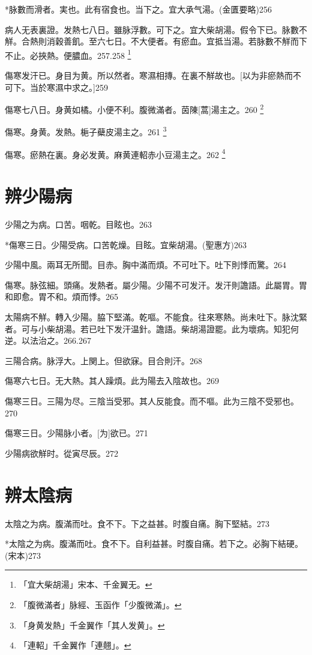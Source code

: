 \documentclass[12pt,twoside,UTF8,b5paper]{ctexbook}
\begin{document}
*脉數而滑者。実也。此有宿食也。当下之。宜大承气湯。(金匱要略)256

病人无表裏證。发熱七八日。雖脉浮數。可下之。宜大柴胡湯。假令下已。脉數不觧。合熱則消穀善飢。至六七日。不大便者。有瘀血。宜抵当湯。若脉數不觧而下不止。必挾熱。便膿血。257.258
	\footnote{「宜大柴胡湯」宋本、千金翼无。}

傷寒发汗已。身目为黄。所以然者。寒濕相摶。在裏不觧故也。[以为非瘀熱而不可下。当於寒濕中求之。]259

傷寒七八日。身黄如橘。小便不利。腹微滿者。茵陳[蒿]湯主之。260
	\footnote{「腹微滿者」脉經、玉函作「少腹微滿」。}

傷寒。身黄。发熱。梔子蘗皮湯主之。261
	\footnote{「身黄发熱」千金翼作「其人发黄」。}

傷寒。瘀熱在裏。身必发黄。麻黄連軺赤小豆湯主之。262
	\footnote{「連軺」千金翼作「連翹」。}

\chapter{辨少陽病}

少陽之为病。口苦。咽乾。目眩也。263

*傷寒三日。少陽受病。口苦乾燥。目眩。宜柴胡湯。(聖惠方)263

少陽中風。兩耳无所聞。目赤。胸中滿而煩。不可吐下。吐下則悸而驚。264

傷寒。脉弦細。頭痛。发熱者。屬少陽。少陽不可发汗。发汗則譫語。此屬胃。胃和即愈。胃不和。煩而悸。265

太陽病不觧。轉入少陽。脇下堅滿。乾嘔。不能食。往來寒熱。尚未吐下。脉沈緊者。可与小柴胡湯。若已吐下发汗温針。譫語。柴胡湯證罷。此为壞病。知犯何逆。以法治之。266.267

三陽合病。脉浮大。上関上。但欲寐。目合則汗。268

傷寒六七日。无大熱。其人躁煩。此为陽去入陰故也。269

傷寒三日。三陽为尽。三陰当受邪。其人反能食。而不嘔。此为三陰不受邪也。270

傷寒三日。少陽脉小者。[为]欲已。271

少陽病欲觧时。從寅尽辰。272

\chapter{辨太陰病}

太陰之为病。腹滿而吐。食不下。下之益甚。时腹自痛。胸下堅結。273

*太陰之为病。腹滿而吐。食不下。自利益甚。时腹自痛。若下之。必胸下結硬。(宋本)273
\end{document}

